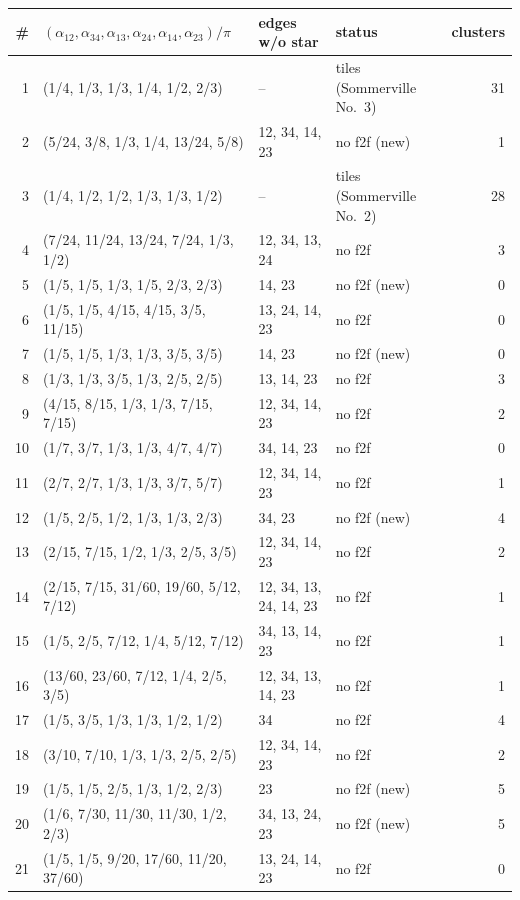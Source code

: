 \documentclass[11pt]{amsart}
\theoremstyle{definition}
\begin{document}
\begin{table}[p]
\small\renewcommand{\arraystretch}{1.12}
\begin{tabular}{@{}rlllr@{}}
\toprule
\# & $(\alpha_{12},\alpha_{34},\alpha_{13},\alpha_{24},\alpha_{14},\alpha_{23})/\pi$ & edges w/o star & status & clusters \\
\midrule
1 & (1/4, 1/3, 1/3, 1/4, 1/2, 2/3) & -- & tiles (Sommerville No.~3) & 31 \\
2 & (5/24, 3/8, 1/3, 1/4, 13/24, 5/8) & 12, 34, 14, 23 & no f2f (new) & 1 \\
3 & (1/4, 1/2, 1/2, 1/3, 1/3, 1/2) & -- & tiles (Sommerville No.~2) & 28 \\
4 & (7/24, 11/24, 13/24, 7/24, 1/3, 1/2) & 12, 34, 13, 24 & no f2f & 3 \\
5 & (1/5, 1/5, 1/3, 1/5, 2/3, 2/3) & 14, 23 & no f2f (new) & 0 \\
6 & (1/5, 1/5, 4/15, 4/15, 3/5, 11/15) & 13, 24, 14, 23 & no f2f & 0 \\
7 & (1/5, 1/5, 1/3, 1/3, 3/5, 3/5) & 14, 23 & no f2f (new) & 0 \\
8 & (1/3, 1/3, 3/5, 1/3, 2/5, 2/5) & 13, 14, 23 & no f2f & 3 \\
9 & (4/15, 8/15, 1/3, 1/3, 7/15, 7/15) & 12, 34, 14, 23 & no f2f & 2 \\
10 & (1/7, 3/7, 1/3, 1/3, 4/7, 4/7) & 34, 14, 23 & no f2f & 0 \\
11 & (2/7, 2/7, 1/3, 1/3, 3/7, 5/7) & 12, 34, 14, 23 & no f2f & 1 \\
12 & (1/5, 2/5, 1/2, 1/3, 1/3, 2/3) & 34, 23 & no f2f (new) & 4 \\
13 & (2/15, 7/15, 1/2, 1/3, 2/5, 3/5) & 12, 34, 14, 23 & no f2f & 2 \\
14 & (2/15, 7/15, 31/60, 19/60, 5/12, 7/12) & 12, 34, 13, 24, 14, 23 & no f2f & 1 \\
15 & (1/5, 2/5, 7/12, 1/4, 5/12, 7/12) & 34, 13, 14, 23 & no f2f & 1 \\
16 & (13/60, 23/60, 7/12, 1/4, 2/5, 3/5) & 12, 34, 13, 14, 23 & no f2f & 1 \\
17 & (1/5, 3/5, 1/3, 1/3, 1/2, 1/2) & 34 & no f2f & 4 \\
18 & (3/10, 7/10, 1/3, 1/3, 2/5, 2/5) & 12, 34, 14, 23 & no f2f & 2 \\
19 & (1/5, 1/5, 2/5, 1/3, 1/2, 2/3) & 23 & no f2f (new) & 5 \\
20 & (1/6, 7/30, 11/30, 11/30, 1/2, 2/3) & 34, 13, 24, 23 & no f2f (new) & 5 \\
21 & (1/5, 1/5, 9/20, 17/60, 11/20, 37/60) & 13, 24, 14, 23 & no f2f & 0 \\

\end{tabular}
\end{table}
\end{document}
